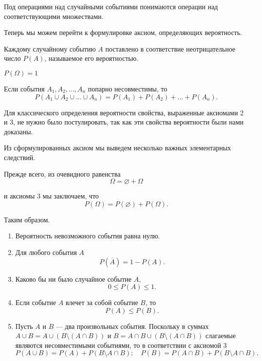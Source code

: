 Под операциями над случайными событиями понимаются операции над соответствующими множествами. 

Теперь мы можем перейти к формулировке аксиом, определяющих вероятность.
\begin{axiome} 
Каждому случайному событию $A$ поставлено в соответствие неотрицательное число $P(A)$, называемое его вероятностью.
\end{axiome}
\begin{axiome} 
$P(\Omega) = 1$
\end{axiome}
\begin{axiome}[сложения] 
Если события $A_1,A_2, \ldots, A_n$ попарно несовместимы, то 
$$
P(A_1 \cup A_2 \cup \ldots \cup A_n) = P(A_1) + P(A_2) + \ldots + P(A_n).
$$
\end{axiome}
Для классического определения вероятности свойства, выраженные аксиомами 2 и 3, не нужно было постулировать, так как эти свойства вероятности были нами доказаны.

Из сформулированных аксиом мы выведем несколько важных элементарных следствий.

Прежде всего, из очевидного равенства
$$
\Omega = \varnothing + \Omega
$$

и аксиомы 3 мы заключаем, что
$$
P(\Omega) = P(\varnothing) + P(\Omega).
$$

Таким образом.
\begin{enumerate}
\item
Вероятность невозможного события равна нулю.
\item	
Для любого события $A$
$$
P(\overline{A}) = 1 - P(A).
$$
\item
Каково бы ни было случайное событие $A$,
$$
0 \le P(A) \le 1.
$$
\item
Если событие $A$ влечет за собой событие $B$, то
$$
P(A) \le P(B).
$$
\item
Пусть $A$ и $B$ --- два произвольных события. Поскольку в суммах $A \cup B = A \cup (B \setminus (A\cap B))$ и $B = A\cap B \cup (B \setminus (A\cap B))$ слагаемые являются несовместимыми событиями, то в соответствии с аксиомой 3
$$
P(A \cup B) = P(A) + P(B \setminus A\cap B);\quad P(B) = P(A\cap B) + P(B \setminus A\cap B).
$$
\end{enumerate}

